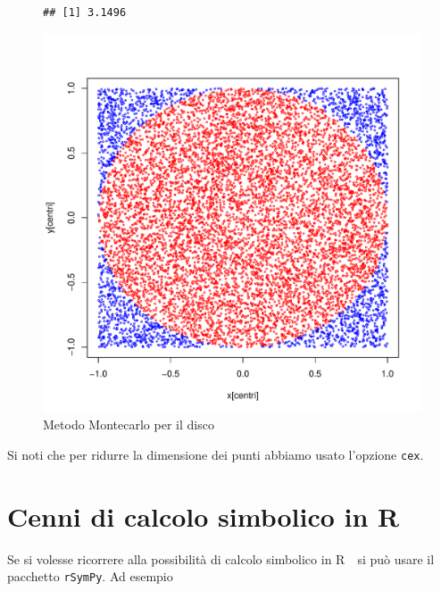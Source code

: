 \documentclass[onecolumn,11pt]{book}\usepackage[]{graphicx}\usepackage[]{color}
\makeatletter
\def\maxwidth{ %
  \ifdim\Gin@nat@width>\linewidth
    \linewidth
  \else
    \Gin@nat@width
  \fi
}
\newenvironment{kframe}{%
 \def\at@end@of@kframe{}%
 \ifinner\ifhmode%
  \def\at@end@of@kframe{\end{minipage}}%
  \begin{minipage}{\columnwidth}%
 \fi\fi%
 \def\FrameCommand##1{\hskip\@totalleftmargin \hskip-\fboxsep
 \colorbox{shadecolor}{##1}\hskip-\fboxsep
     \hskip-\linewidth \hskip-\@totalleftmargin \hskip\columnwidth}%
 \MakeFramed {\advance\hsize-\width
   \@totalleftmargin\z@ \linewidth\hsize
   \@setminipage}}%
 {\par\unskip\endMakeFramed%
 \at@end@of@kframe}
\newenvironment{knitrout}{}{} %
\newcommand{\rpr}{\textsf{R}~}
\makeatother
\begin{document}
\begin{figure}[htbp]
\begin{center}
\begin{knitrout}
\color{fgcolor}\begin{kframe}
\begin{verbatim}
## [1] 3.1496
\end{verbatim}
\end{kframe}
\includegraphics[width=\maxwidth]{figure/unnamed-chunk-152-1} 

\end{knitrout}
\caption{Metodo Montecarlo per il disco}
\label{fig:montecarlo}
\end{center}
\end{figure}
 Si noti che per ridurre la dimensione dei punti abbiamo usato l'opzione \texttt{cex}.
\section{Cenni di calcolo simbolico in \rpr}
Se si volesse ricorrere alla possibilit\`a di calcolo simbolico in \rpr\ si pu\`o usare il pacchetto \texttt{rSymPy}. Ad esempio
\end{document}

